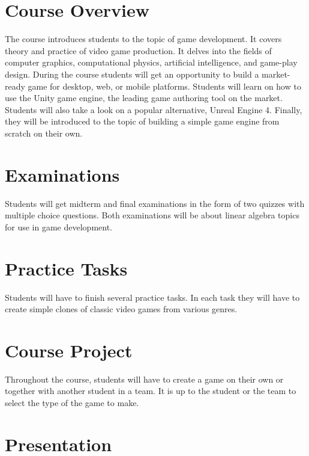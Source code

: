\documentclass[12pt,a4paper,oneside]{article}
\begin{document}
    \section{Course Overview}

        The course introduces students to the topic of game development. It
        covers theory and practice of video game production. It delves into the
        fields of computer graphics, computational physics, artificial
        intelligence, and game-play design. During the course students will get
        an opportunity to build a market-ready game for desktop, web, or mobile
        platforms.  Students will learn on how to use the Unity game engine, the
        leading game authoring tool on the market. Students will also take a
        look on a popular alternative, Unreal Engine 4. Finally, they will be
        introduced to the topic of building a simple game engine from scratch on
        their own.

    \section{Examinations}

        Students will get midterm and final examinations in the form of two
        quizzes with multiple choice questions. Both examinations will be about
        linear algebra topics for use in game development.

    \section{Practice Tasks}

        Students will have to finish several practice tasks. In each task they
        will have to create simple clones of classic video games from various
        genres.

    \section{Course Project}

        Throughout the course, students will have to create a game on their own
        or together with another student in a team. It is up to the student or
        the team to select the type of the game to make.

    \section{Presentation}
\end{document}
